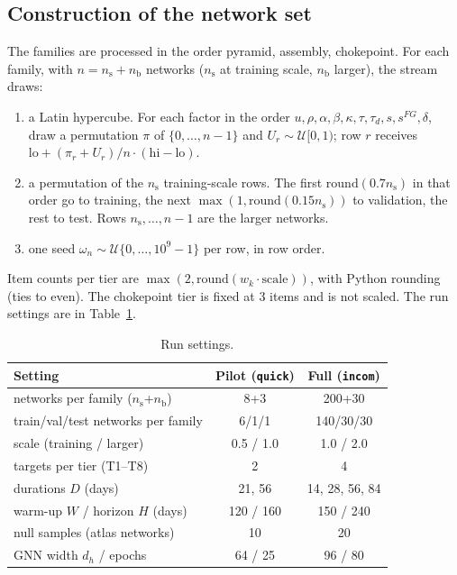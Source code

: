 \documentclass{ifacconf}
\begin{document}
\subsection{Construction of the network set}
\label{app:set}
The families are processed in the order pyramid, assembly, chokepoint. For each family, with $n=n_{\mathrm{s}}+n_{\mathrm{b}}$ networks ($n_{\mathrm{s}}$ at training scale, $n_{\mathrm{b}}$ larger), the stream draws:
\begin{enumerate}
\item a Latin hypercube. For each factor in the order $u,\rho,\alpha,\beta,\kappa,\tau,\tau_d,s,s^{FG},\delta$, draw a permutation $\pi$ of $\{0,\dots,n-1\}$ and $U_r\sim\mathcal{U}[0,1)$; row $r$ receives $\mathrm{lo}+(\pi_r+U_r)/n\cdot(\mathrm{hi}-\mathrm{lo})$.
\item a permutation of the $n_{\mathrm{s}}$ training-scale rows. The first $\mathrm{round}(0.7n_{\mathrm{s}})$ in that order go to training, the next $\max(1,\mathrm{round}(0.15n_{\mathrm{s}}))$ to validation, the rest to test. Rows $n_{\mathrm{s}},\dots,n-1$ are the larger networks.
\item one seed $\omega_n\sim\mathcal{U}\{0,\dots,10^9-1\}$ per row, in row order.
\end{enumerate}
Item counts per tier are $\max(2,\mathrm{round}(w_k\cdot\mathrm{scale}))$, with Python rounding (ties to even). The chokepoint tier is fixed at 3 items and is not scaled. The run settings are in Table~\ref{tab:runs}.

\begin{table}[h]
\caption{Run settings.}
\label{tab:runs}
\centering\footnotesize
\begin{tabular}{lcc}
\toprule
Setting & Pilot (\texttt{quick}) & Full (\texttt{incom}) \\
\midrule
networks per family ($n_{\mathrm{s}}$+$n_{\mathrm{b}}$) & 8+3 & 200+30 \\
train/val/test networks per family & 6/1/1 & 140/30/30 \\
scale (training / larger) & 0.5 / 1.0 & 1.0 / 2.0 \\
targets per tier (T1--T8) & 2 & 4 \\
durations $D$ (days) & 21, 56 & 14, 28, 56, 84 \\
warm-up $W$ / horizon $H$ (days) & 120 / 160 & 150 / 240 \\
null samples (atlas networks) & 10 & 20 \\
GNN width $d_h$ / epochs & 64 / 25 & 96 / 80 \\
\bottomrule
\end{tabular}
\end{table}
\end{document}
